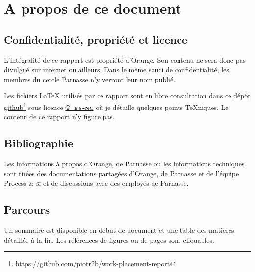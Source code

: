 \chapter*{A propos de ce document}

\section*{Confidentialité, propriété et licence}
L'intégralité de ce rapport est propriété d'Orange. Son contenu ne sera donc pas divulgué sur internet ou ailleurs. Dans le même souci de confidentialité, les membres du cercle Parnasse n'y verront leur nom publié.

Les fichiers \LaTeX{} utilisés par ce rapport sont en libre consultation dans ce \href{https://github.com/piotr2b/work-placement-report}{dépôt github}\footnote{\url{https://github.com/piotr2b/work-placement-report}} sous licence \href{https://creativecommons.org/licenses/by-nc/4.0/deed.fr}{\textbf{©~\textsc{by-nc}}} où je détaille quelques points \TeX{}niques. Le contenu de ce rapport n'y figure pas.


\section*{Bibliographie}
Les informations à propos d'Orange, de Parnasse ou les informations techniques sont tirées des documentations partagées d'Orange, de Parnasse et de l'équipe Process \& \textsc{si} et de discussions avec des employés de Parnasse.

\section*{Parcours}
Un sommaire est disponible en début de document et une table des matières détaillée à la fin. Les références de figures ou de pages sont cliquables.

